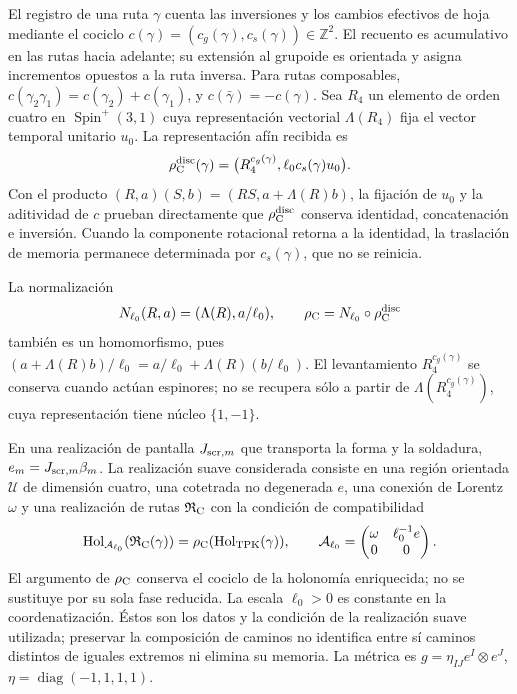El registro de una ruta \(\gamma\) cuenta las inversiones y los
cambios efectivos de hoja mediante el cociclo
\(c(\gamma)=(c_g(\gamma),c_s(\gamma))\in\mathbb Z^2\).
El recuento es acumulativo en las rutas hacia adelante; su
extensión al grupoide es orientada y asigna incrementos opuestos
a la ruta inversa.
Para rutas composables,
\(c(\gamma_2\gamma_1)=c(\gamma_2)+c(\gamma_1)\), y
\(c(\bar\gamma)=-c(\gamma)\). Sea \(R_4\) un elemento de orden
cuatro en \(\operatorname{Spin}^+(3,1)\) cuya representación
vectorial \(\Lambda(R_4)\) fija el vector temporal unitario \(u_0\).
La representación afín recibida es
\[
 \rho_{\rm C}^{\rm disc}(\gamma)
 =\bigl(R_4^{c_g(\gamma)},\ell_0c_s(\gamma)u_0\bigr).
\]
Con el producto
\((R,a)(S,b)=(RS,a+\Lambda(R)b)\), la fijación de \(u_0\) y la
aditividad de \(c\) prueban directamente que \(\rho_{\rm C}^{\rm disc}\)
conserva identidad, concatenación e inversión. Cuando la componente
rotacional retorna a la identidad, la traslación de memoria permanece
determinada por \(c_s(\gamma)\), que no se reinicia.

La normalización
\[
 N_{\ell_0}(R,a)=(\Lambda(R),a/\ell_0),\qquad
 \rho_{\rm C}=N_{\ell_0}\circ\rho_{\rm C}^{\rm disc}
\]
también es un homomorfismo, pues
\((a+\Lambda(R)b)/\ell_0=a/\ell_0+\Lambda(R)(b/\ell_0)\).
El levantamiento \(R_4^{c_g(\gamma)}\) se conserva cuando actúan
espinores; no se recupera sólo a partir de \(\Lambda(R_4^{c_g(\gamma)})\),
cuya representación tiene núcleo \(\{1,-1\}\).

En una realización de pantalla \(J_{{\rm scr},m}\) que transporta
la forma y la soldadura, \(e_m=J_{{\rm scr},m}\beta_m\).
La realización suave considerada consiste en una región orientada
\(\mathcal U\) de dimensión cuatro, una cotetrada no degenerada
\(e\), una conexión de Lorentz \(\omega\) y una realización de rutas
\(\mathfrak R_{\rm C}\) con la condición de compatibilidad
\begin{equation}
 \operatorname{Hol}_{\mathcal A_{\ell_0}}
          (\mathfrak R_{\rm C}(\gamma))
 =\rho_{\rm C}(\operatorname{Hol}_{\rm TPK}(\gamma)),\qquad
 \mathcal A_{\ell_0}=
 \begin{pmatrix}\omega&\ell_0^{-1}e\\0&0\end{pmatrix}.
\label{hmtcuatro:ant:compatibilidad-holonomia}
\end{equation}
El argumento de \(\rho_{\rm C}\) conserva el cociclo de la
holonomía enriquecida; no se sustituye por su sola fase reducida.
La escala \(\ell_0>0\) es constante en la coordenatización. Éstos
son los datos y la condición de la realización suave utilizada;
preservar la composición de caminos no identifica entre sí caminos
distintos de iguales extremos ni elimina su memoria. La métrica
es \(g=\eta_{IJ}e^I\otimes e^J\), \(\eta=\operatorname{diag}(-1,1,1,1)\).

